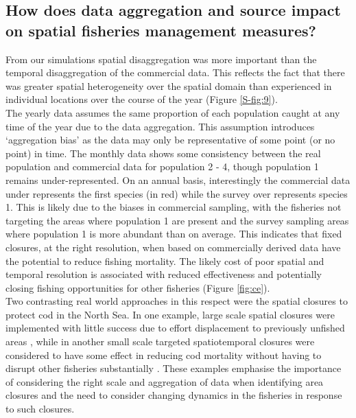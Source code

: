 \documentclass[review]{elsarticle}
\begin{document}
\subsection{How does data aggregation and source impact on spatial fisheries
	management measures?}

From our simulations spatial disaggregation was more important than the
temporal disaggregation of the commercial data. This reflects the fact that
there was greater spatial heterogeneity over the spatial domain than
experienced in individual locations over the course of the year (Figure
\ref{S-fig:9}). \\ 

The yearly data assumes the same proportion of each population caught at any
time of the year due to the data aggregation. This assumption introduces
`aggregation bias' as the data may only be representative of some point (or no
point) in time. The monthly data shows some consistency between the real
population and commercial data for population 2 - 4, though population 1 remains
under-represented.  On an annual basis, interestingly the commercial data under
represents the first species (in red) while the survey over represents species
1. This is likely due to the biases in commercial sampling, with the fisheries
not targeting the areas where population 1 are present and the survey sampling
areas where population 1 is more abundant than on average. This indicates that
fixed closures, at the right resolution, when based on commercially derived
data have the potential to reduce fishing mortality. The likely cost
of poor spatial and temporal resolution is associated with reduced
effectiveness and potentially closing fishing opportunities for other fisheries
(Figure \ref{fig:ce}). \\

Two contrasting real world approaches in this respect were the spatial closures
to protect cod in the North Sea. In one example, large scale spatial closures
were implemented with little success due to effort displacement to previously
unfished areas \citep{Dinmore2003}, while in another small scale targeted
spatiotemporal closures were considered to have some effect in reducing cod
mortality without having to disrupt other fisheries substantially
\citep{Needle2011}. These examples emphasise the importance of considering the
right scale and aggregation of data when identifying area closures and the need
to consider changing dynamics in the fisheries in response to such closures. \\
\end{document}
